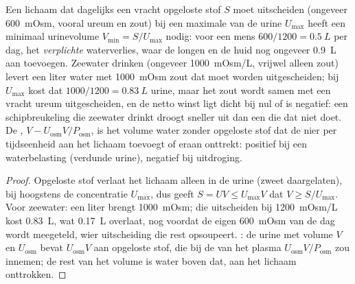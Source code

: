 \begin{proposition}\label{prop:b3:renal-osmoregulation:water}
Een lichaam dat dagelijks een vracht opgeloste stof $S$ moet
uitscheiden (ongeveer \qty{600}{mOsm}, vooral ureum en zout) bij een
maximale  van de urine $U_{\max}$ heeft een minimaal
urinevolume $V_{\min} = S/U_{\max}$ nodig: voor een mens
$600/1200 = \qty{0.5}{L}$ per dag, het \emph{verplichte} waterverlies,
waar de longen en de huid nog ongeveer \qty{0.9}{L} aan toevoegen.
Zeewater drinken (ongeveer \qty{1000}{mOsm/L}, vrijwel alleen zout)
levert een liter water met \qty{1000}{mOsm} zout dat moet worden
uitgescheiden; bij $U_{\max}$ kost dat $1000/1200 = \qty{0.83}{L}$
urine, maar het zout wordt samen met een vracht ureum uitgescheiden, en
de netto winst ligt dicht bij nul of is negatief: een schipbreukeling
die zeewater drinkt droogt sneller uit dan een die dat niet doet. De
\emph{}, $V - U_{\text{osm}}V/P_{\text{osm}}$, is het
volume water zonder opgeloste stof dat de nier per tijdseenheid aan het
lichaam toevoegt of eraan onttrekt: positief bij een waterbelasting
(verdunde urine), negatief bij uitdroging.
\end{proposition}
\begin{proof}
Opgeloste stof verlaat het lichaam alleen in de urine (zweet
daargelaten), bij hoogstens de concentratie $U_{\max}$, dus geeft
$S = U V \le U_{\max}V$ dat $V \ge S/U_{\max}$. Voor zeewater: een
liter brengt \qty{1000}{mOsm}; die uitscheiden bij \qty{1200}{mOsm/L}
kost \qty{0.83}{L}, wat \qty{0.17}{L} overlaat, nog voordat de eigen
\qty{600}{mOsm} van de dag wordt meegeteld, wier uitscheiding die rest
opsoupeert. : de urine met volume $V$ en 
$U_{\text{osm}}$ bevat $U_{\text{osm}}V$ aan opgeloste stof, die bij de
 van het plasma $U_{\text{osm}}V/P_{\text{osm}}$ zou
innemen; de rest van het volume is water boven dat, aan het lichaam
onttrokken.
\end{proof}

